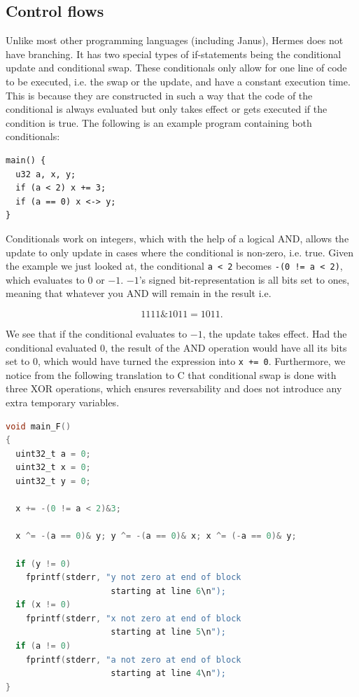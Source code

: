 \subsection{Control flows}
Unlike most other programming languages (including Janus), Hermes does not have branching. It has two special types of if-statements being the conditional update and conditional swap. These conditionals only allow for one line of code to be executed, i.e. the swap or the update, and have a constant execution time. This is because they are constructed in such a way that the code of the conditional is always evaluated but only takes effect or gets executed if the condition is true. The following is an example program containing both conditionals:
\begin{lstlisting}[language=Hermes]
main() {
  u32 a, x, y;
  if (a < 2) x += 3;
  if (a == 0) x <-> y;
}
\end{lstlisting}
Conditionals work on integers, which with the help of a logical AND, allows the update to only update in cases where the conditional is non-zero, i.e. true. Given the example we just looked at, the conditional \lstinline{a < 2} becomes \lstinline{-(0 != a < 2)}, which evaluates to $0$ or $-1$. $-1$'s signed bit-representation is all bits set to ones, meaning that whatever you AND will remain in the result i.e.

\begin{equation*}
  1111 \& 1011 = 1011.
\end{equation*}

We see that if the conditional evaluates to $-1$, the update takes effect. Had the conditional evaluated 0, the result of the AND operation would have all its bits set to $0$, which would have turned the expression into \lstinline{x += 0}.
Furthermore, we notice from the following translation to C that conditional swap is done with three XOR operations, which ensures reversability and does not introduce any extra temporary variables.

\begin{lstlisting}[language=C, float=tp]
void main_F()
{
  uint32_t a = 0;
  uint32_t x = 0;
  uint32_t y = 0;

  x += -(0 != a < 2)&3;

  x ^= -(a == 0)& y; y ^= -(a == 0)& x; x ^= (-a == 0)& y;

  if (y != 0)
    fprintf(stderr, "y not zero at end of block
                     starting at line 6\n");
  if (x != 0)
    fprintf(stderr, "x not zero at end of block
                     starting at line 5\n");
  if (a != 0)
    fprintf(stderr, "a not zero at end of block
                     starting at line 4\n");
}
\end{lstlisting}

